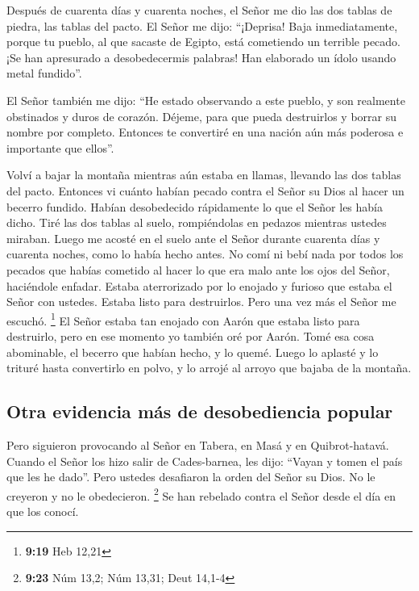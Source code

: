  Después de cuarenta días y cuarenta noches, el Señor me
dio las dos tablas de piedra, las tablas del pacto.  El
Señor me dijo: ``¡Deprisa! Baja inmediatamente, porque tu pueblo, al que
sacaste de Egipto, está cometiendo un terrible pecado. ¡Se han
apresurado a desobedecermis palabras! Han elaborado un ídolo usando
metal fundido''.

 El Señor también me dijo: ``He estado observando a este
pueblo, y son realmente obstinados y duros de corazón. 
Déjeme, para que pueda destruirlos y borrar su nombre por completo.
Entonces te convertiré en una nación aún más poderosa e importante que
ellos''.

 Volví a bajar la montaña mientras aún estaba en llamas,
llevando las dos tablas del pacto.  Entonces vi cuánto
habían pecado contra el Señor su Dios al hacer un becerro fundido.
Habían desobedecido rápidamente lo que el Señor les había dicho.
 Tiré las dos tablas al suelo, rompiéndolas en pedazos
mientras ustedes miraban.  Luego me acosté en el suelo
ante el Señor durante cuarenta días y cuarenta noches, como lo había
hecho antes. No comí ni bebí nada por todos los pecados que habías
cometido al hacer lo que era malo ante los ojos del Señor, haciéndole
enfadar.  Estaba aterrorizado por lo enojado y furioso
que estaba el Señor con ustedes. Estaba listo para destruirlos. Pero una
vez más el Señor me escuchó. \footnote{\textbf{9:19} Heb 12,21}
 El Señor estaba tan enojado con Aarón que estaba listo
para destruirlo, pero en ese momento yo también oré por Aarón.
 Tomé esa cosa abominable, el becerro que habían hecho, y
lo quemé. Luego lo aplasté y lo trituré hasta convertirlo en polvo, y lo
arrojé al arroyo que bajaba de la montaña.

\hypertarget{otra-evidencia-muxe1s-de-desobediencia-popular}{%
\subsection{Otra evidencia más de desobediencia
popular}\label{otra-evidencia-muxe1s-de-desobediencia-popular}}

 Pero siguieron provocando al Señor en Tabera, en Masá y
en Quibrot-hatavá.  Cuando el Señor los hizo salir de
Cades-barnea, les dijo: ``Vayan y tomen el país que les he dado''. Pero
ustedes desafiaron la orden del Señor su Dios. No le creyeron y no le
obedecieron. \footnote{\textbf{9:23} Núm 13,2; Núm 13,31; Deut 14,1-4}
 Se han rebelado contra el Señor desde el día en que los
conocí.

